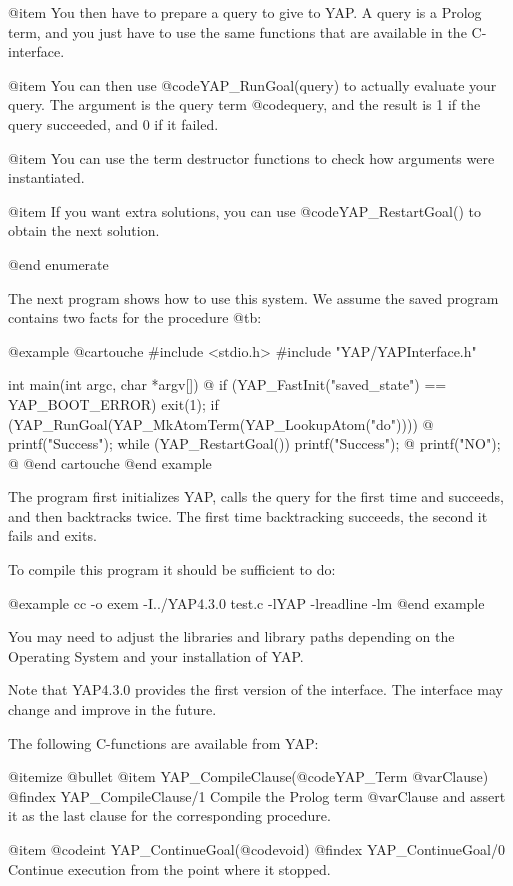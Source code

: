 {{{{{{{{{@item You then have to prepare a query to give to
YAP. A query is a Prolog term, and you just have to use the same
functions that are available in the C-interface.

@item You can then use @code{YAP_RunGoal(query)} to actually evaluate your
query. The argument is the query term @code{query}, and the result is 1
if the query succeeded, and 0 if it failed.

@item You can use the term destructor functions to check how
arguments were instantiated.

@item If you want extra solutions, you can use
@code{YAP_RestartGoal()} to obtain the next solution.

@end enumerate

The next program shows how to use this system. We assume the saved
program contains two facts for the procedure @t{b}:

@example
@cartouche
#include <stdio.h>
#include "YAP/YAPInterface.h"


int
main(int argc, char *argv[]) @{
  if (YAP_FastInit("saved_state") == YAP_BOOT_ERROR)
    exit(1);
  if (YAP_RunGoal(YAP_MkAtomTerm(YAP_LookupAtom("do")))) @{
    printf("Success\n");
    while (YAP_RestartGoal())
      printf("Success\n");
  @}
  printf("NO\n");
@}
@end cartouche
@end example

The program first initializes YAP, calls the query for the
first time and succeeds, and then backtracks twice. The first time
backtracking succeeds, the second it fails and exits.

To compile this program it should be sufficient to do:

@example
cc -o exem -I../YAP4.3.0 test.c -lYAP -lreadline -lm
@end example

You may need to adjust the libraries and library paths depending on the
Operating System and your installation of YAP.

Note that YAP4.3.0 provides the first version of the interface. The
interface may change and improve in the future.

The following C-functions are available from YAP:

@itemize @bullet
@item  YAP_CompileClause(@code{YAP_Term} @var{Clause})
@findex  YAP_CompileClause/1
Compile the Prolog term @var{Clause} and assert it as the last clause
for the corresponding procedure.

@item  @code{int} YAP_ContinueGoal(@code{void})
@findex YAP_ContinueGoal/0
Continue execution from the point where it stopped.

}}}}}}}}}
